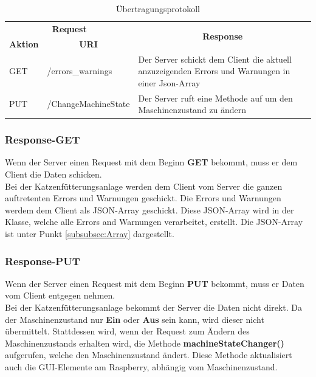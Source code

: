 \begin{table}[htb]
\centering
\begin{tabular}{|l|l|p{290pt}|}
\hline
\multicolumn{2}{|c|}{\textbf{Request}}                                    & \multicolumn{1}{c|}{\multirow{2}{*}{\textbf{Response}}}                                          \\ \cline{1-2}
\multicolumn{1}{|c|}{\textbf{Aktion}} & \multicolumn{1}{c|}{\textbf{\ac{URI}}} & \multicolumn{1}{c|}{}                                                                            \\ \hline
GET                                   & /errors\_warnings                 & Der Server schickt dem Client die aktuell anzuzeigenden Errors und Warnungen in einer Json-Array \\ \hline
PUT                                   & /ChangeMachineState               & Der Server ruft eine Methode auf um den Maschinenzustand zu ändern                               \\ \hline
\end{tabular}
\caption{Übertragungsprotokoll}
\label{Übertragungsprotokoll}
\end{table}

\subsubsection{Response-GET}
Wenn der Server einen Request mit dem Beginn \textbf{GET} bekommt, muss er dem Client die Daten schicken. 
\\ Bei der Katzenfütterungsanlage werden dem Client vom Server die ganzen auftretenten Errors und Warnungen geschickt. Die Errors und Warnungen werdem dem Client als \ac{JSON}-Array geschickt. Diese \ac{JSON}-Array wird in der Klasse, welche alle Errors and Warnungen verarbeitet, erstellt. Die \ac{JSON}-Array ist unter Punkt \ref{subsubsec:Array} dargestellt. 

\subsubsection{Response-PUT}
Wenn der Server einen Request mit dem Beginn \textbf{PUT} bekommt, muss er Daten vom Client entgegen nehmen.
\\ Bei der Katzenfütterungsanlage bekommt der Server die Daten nicht direkt. Da der Maschinenzustand nur \textbf{Ein} oder \textbf{Aus} sein kann, wird dieser nicht übermittelt. Stattdessen wird, wenn der Request zum Ändern des Maschinenzustands erhalten wird, die Methode \textbf{machineStateChanger()} aufgerufen, welche den Maschinenzustand ändert. Diese Methode aktualisiert auch die \ac{GUI}-Elemente am Raspberry, abhängig vom Maschinenzustand. 

